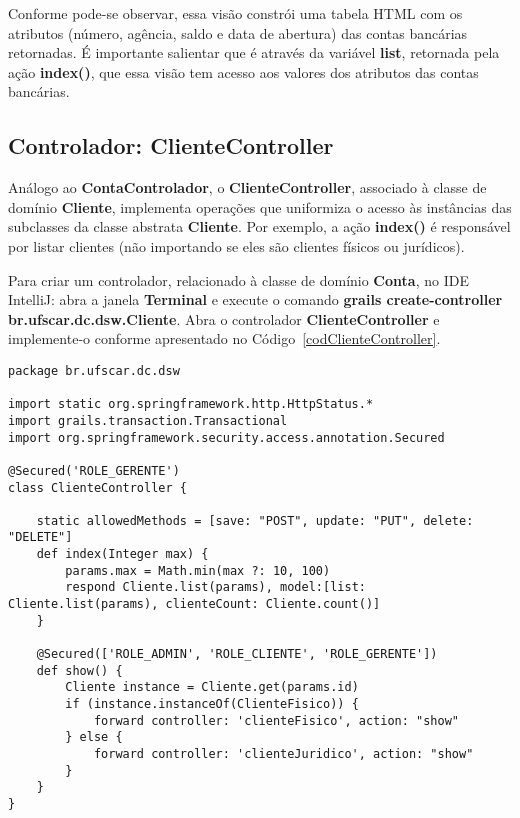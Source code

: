 \vspace{0.3cm}

\noindent Conforme pode-se observar, essa  visão constrói uma tabela HTML com os
atributos  (número, agência,  saldo e  data  de abertura)  das contas  bancárias
retornadas.   É importante  salientar  que  é através  da  variável {\bf  list},
retornada pela  ação {\bf index()},  que essa visão  tem acesso aos  valores dos
atributos das contas bancárias.  

\newpage

\subsection{Controlador: ClienteController}

\vspace{0.5cm}

Análogo ao {\bf ContaControlador}, o {\bf ClienteController}, associado à classe
de  domínio {\bf  Cliente},  implementa  operações que  uniformiza  o acesso  às
instâncias das subclasses da classe abstrata {\bf Cliente}.  Por exemplo, a ação
{\bf  index()} é responsável  por listar  clientes (não  importando se  eles são
clientes físicos ou jurídicos). 

\vspace{0.3cm}

Para criar um  controlador, relacionado à classe de domínio  {\bf Conta}, no IDE
IntelliJ:  abra  a  janela  {\bf  Terminal}  e execute  o  comando  {\bf  grails
  create-controller   br.ufscar.dc.dsw.Cliente}.    Abra   o  controlador   {\bf
  ClienteController}     e      implemente-o     conforme     apresentado     no
Código~\ref{codClienteController}.  

\begin{lstlisting}[caption=Controlador          {\bf         ClienteController},
    frame=trBL,float=htbp, label=codClienteController] 
package br.ufscar.dc.dsw

import static org.springframework.http.HttpStatus.*
import grails.transaction.Transactional
import org.springframework.security.access.annotation.Secured

@Secured('ROLE_GERENTE')
class ClienteController {
    
    static allowedMethods = [save: "POST", update: "PUT", delete: "DELETE"]
    def index(Integer max) {
        params.max = Math.min(max ?: 10, 100)
        respond Cliente.list(params), model:[list: Cliente.list(params), clienteCount: Cliente.count()]
    }
    
    @Secured(['ROLE_ADMIN', 'ROLE_CLIENTE', 'ROLE_GERENTE'])
    def show() {
        Cliente instance = Cliente.get(params.id)
        if (instance.instanceOf(ClienteFisico)) {
            forward controller: 'clienteFisico', action: "show"
        } else {
            forward controller: 'clienteJuridico', action: "show"
        }
    }
}
\end{lstlisting}

